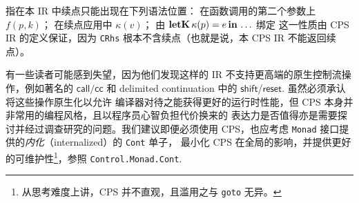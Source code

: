 \begin{remark}[二等公民续点] 指在本 IR 中续点只能出现在下列语法位置：
  在函数调用的第二个参数上 $f(p, k)$；
  在续点应用中 $\kappa(v)$；
  由 $\mathbf{letK}\, \kappa(p) = e\, \mathbf{in}\, \ldots$ 绑定
  这一性质由 CPS IR 的定义保证，因为 \texttt{CRhs} 根本不含续点（也就是说，本 CPS IR 不能返回续点）。

  有一些读者可能感到失望，因为他们发现这样的 IR 不支持更高端的原生控制流操作，例如著名的 $\mathsf{call/cc}$ 和 delimited
  continuation 中的 $\mathsf{shift}$/$\mathsf{reset}$. 虽然必须承认将这些操作原生化以允许
  编译器对待之能获得更好的运行时性能，但 CPS 本身并非常用的编程风格，且以程序员心智负担代价换来的
  表达力是否值得亦是需要探讨并经过调查研究的问题。我们建议即便必须使用 CPS，也应考虑 \texttt{Monad} 接口提供的\emph{内化}（internalized）的 \texttt{Cont} 单子，
  最小化 CPS 在全局的影响，并提供更好的可维护性\footnote{
    从思考难度上讲，CPS 并不直观，且滥用之与 \texttt{goto} 无异。
  }，参照 \texttt{Control.Monad.Cont}.
\end{remark}

